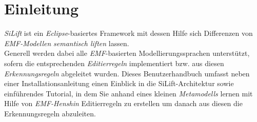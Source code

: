 \section{Einleitung}

\textit{SiLift} ist ein \textit{Eclipse}-basiertes Framework mit dessen Hilfe sich Differenzen von \textit{EMF-Modellen} \textit{semantisch liften} lassen.\\
Generell werden dabei alle \textit{EMF}-basierten Modellierungssprachen unterstützt, sofern die ent\-sprech\-en\-den \textit{Editier\-regeln} implementiert bzw. aus diesen \textit{Er\-ken\-nungs\-re\-geln} abgeleitet wurden.
Dieses Benutzerhandbuch umfasst neben einer Installationsanleitung einen Einblick in die SiLift-Architektur sowie ein\-führ\-en\-des Tutorial, in dem Sie anhand eines kleinen \textit{Metamodells} lernen mit Hilfe von \textit{EMF-Henshin} Editierregeln zu erstellen um danach aus diesen die Erkennungsregeln abzuleiten.